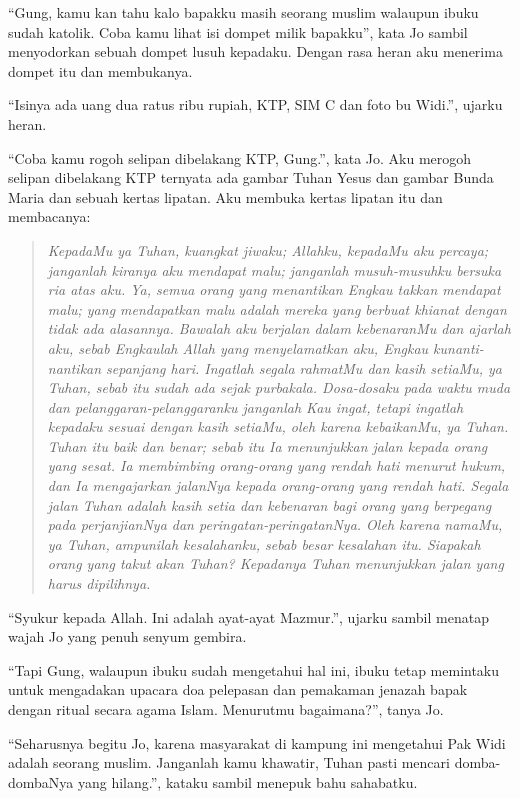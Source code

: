 
 ``Gung, kamu kan tahu kalo bapakku masih seorang muslim walaupun ibuku sudah katolik. Coba kamu lihat isi dompet milik bapakku'', kata Jo sambil menyodorkan sebuah dompet lusuh kepadaku. Dengan rasa heran aku menerima dompet itu dan membukanya.    
 
``Isinya ada uang dua ratus ribu rupiah, KTP, SIM C dan foto bu Widi.'', ujarku heran.

``Coba kamu rogoh selipan dibelakang KTP, Gung.'', kata Jo. Aku merogoh selipan dibelakang KTP ternyata ada gambar Tuhan Yesus dan gambar Bunda Maria dan sebuah kertas lipatan. Aku membuka kertas lipatan itu dan membacanya:
\begin{quote}
\textit{
KepadaMu ya Tuhan, kuangkat jiwaku; Allahku, kepadaMu  aku percaya; janganlah kiranya aku mendapat malu; janganlah musuh-musuhku bersuka ria atas aku. Ya, semua orang yang menantikan Engkau takkan mendapat malu; yang mendapatkan malu adalah mereka yang berbuat khianat dengan tidak ada alasannya. Bawalah aku berjalan dalam kebenaranMu dan ajarlah aku, sebab Engkaulah Allah yang menyelamatkan aku, Engkau kunanti-nantikan sepanjang hari. Ingatlah segala rahmatMu dan kasih setiaMu, ya Tuhan, sebab itu sudah ada sejak purbakala. Dosa-dosaku pada waktu muda dan pelanggaran-pelanggaranku janganlah Kau ingat, tetapi ingatlah kepadaku sesuai dengan kasih setiaMu, oleh karena kebaikanMu, ya Tuhan. Tuhan itu baik dan benar; sebab itu Ia menunjukkan jalan kepada orang yang sesat. Ia membimbing orang-orang yang rendah hati menurut hukum, dan Ia mengajarkan jalanNya kepada orang-orang yang rendah hati. Segala jalan Tuhan adalah kasih setia dan kebenaran bagi orang yang berpegang pada perjanjianNya dan peringatan-peringatanNya. Oleh karena namaMu, ya Tuhan, ampunilah kesalahanku, sebab besar kesalahan itu. Siapakah orang yang takut akan Tuhan? Kepadanya Tuhan menunjukkan jalan yang harus dipilihnya.}
\end{quote}



``Syukur kepada Allah. Ini adalah ayat-ayat Mazmur.'', ujarku sambil menatap wajah Jo yang penuh senyum gembira.

``Tapi Gung, walaupun ibuku sudah mengetahui hal ini, ibuku tetap memintaku untuk mengadakan upacara doa pelepasan dan pemakaman jenazah bapak dengan ritual secara agama Islam. Menurutmu bagaimana?'', tanya Jo. 


``Seharusnya begitu Jo, karena masyarakat di kampung ini mengetahui Pak Widi adalah seorang muslim. Janganlah kamu khawatir, Tuhan pasti mencari domba-dombaNya yang hilang.'', kataku sambil menepuk bahu sahabatku.

